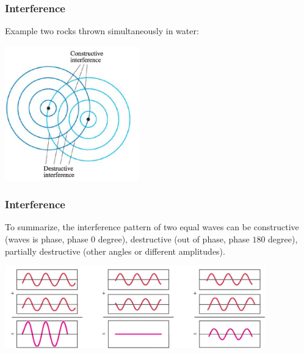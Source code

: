 \documentclass[]{beamer}
\begin{document}

\begin{frame}
\frametitle{Interference }

Example two rocks thrown simultaneously in water: 




  \begin{center}
  \includegraphics[height=2.3in]{images4/16.jpg}
\end{center}



  \end{frame}




\begin{frame}
\frametitle{Interference }

To summarize, the interference pattern of two equal waves can be constructive (waves is phase, phase $0$ degree), destructive (out of phase, phase $180$ degree), partially destructive
(other angles or different amplitudes).







  \begin{center}
  \includegraphics[height=1.4in]{images4/17.jpg}
\end{center}



  \end{frame}
\end{document}
